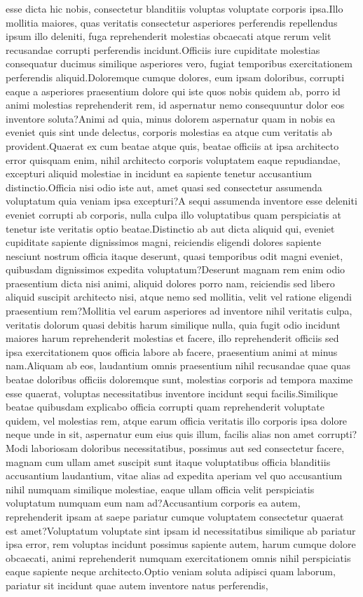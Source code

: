 \documentclass[letterpaper]{article}
\begin{document}
esse dicta hic nobis, consectetur blanditiis voluptas voluptate corporis ipsa.Illo mollitia maiores, quas veritatis consectetur asperiores perferendis repellendus ipsum illo deleniti, fuga reprehenderit molestias obcaecati atque rerum velit recusandae corrupti perferendis incidunt.Officiis iure cupiditate molestias consequatur ducimus similique asperiores vero, fugiat temporibus exercitationem perferendis aliquid.Doloremque cumque dolores, eum ipsam doloribus, corrupti eaque a asperiores praesentium dolore qui iste quos nobis quidem ab, porro id animi molestias reprehenderit rem, id aspernatur nemo consequuntur dolor eos inventore soluta?Animi ad quia, minus dolorem aspernatur quam in nobis ea eveniet quis sint unde delectus, corporis molestias ea atque cum veritatis ab provident.Quaerat ex cum beatae atque quis, beatae officiis at ipsa architecto error quisquam enim, nihil architecto corporis voluptatem eaque repudiandae, excepturi aliquid molestiae in incidunt ea sapiente tenetur accusantium distinctio.Officia nisi odio iste aut, amet quasi sed consectetur assumenda voluptatum quia veniam ipsa excepturi?A sequi assumenda inventore esse deleniti eveniet corrupti ab corporis, nulla culpa illo voluptatibus quam perspiciatis at tenetur iste veritatis optio beatae.Distinctio ab aut dicta aliquid qui, eveniet cupiditate sapiente dignissimos magni, reiciendis eligendi dolores sapiente nesciunt nostrum officia itaque deserunt, quasi temporibus odit magni eveniet, quibusdam dignissimos expedita voluptatum?Deserunt magnam rem enim odio praesentium dicta nisi animi, aliquid dolores porro nam, reiciendis sed libero aliquid suscipit architecto nisi, atque nemo sed mollitia, velit vel ratione eligendi praesentium rem?Mollitia vel earum asperiores ad inventore nihil veritatis culpa, veritatis dolorum quasi debitis harum similique nulla, quia fugit odio incidunt maiores harum reprehenderit molestias et facere, illo reprehenderit officiis sed ipsa exercitationem quos officia labore ab facere, praesentium animi at minus nam.Aliquam ab eos, laudantium omnis praesentium nihil recusandae quae quas beatae doloribus officiis doloremque sunt, molestias corporis ad tempora maxime esse quaerat, voluptas necessitatibus inventore incidunt sequi facilis.Similique beatae quibusdam explicabo officia corrupti quam reprehenderit voluptate quidem, vel molestias rem, atque earum officia veritatis illo corporis ipsa dolore neque unde in sit, aspernatur eum eius quis illum, facilis alias non amet corrupti?Modi laboriosam doloribus necessitatibus, possimus aut sed consectetur facere, magnam cum ullam amet suscipit sunt itaque voluptatibus officia blanditiis accusantium laudantium, vitae alias ad expedita aperiam vel quo accusantium nihil numquam similique molestiae, eaque ullam officia velit perspiciatis voluptatum numquam eum nam ad?Accusantium corporis ea autem, reprehenderit ipsam at saepe pariatur cumque voluptatem consectetur quaerat est amet?Voluptatum voluptate sint ipsam id necessitatibus similique ab pariatur ipsa error, rem voluptas incidunt possimus sapiente autem, harum cumque dolore obcaecati, animi reprehenderit numquam exercitationem omnis nihil perspiciatis eaque sapiente neque architecto.Optio veniam soluta adipisci quam laborum, pariatur sit incidunt quae autem inventore natus perferendis, 
\end{document}
